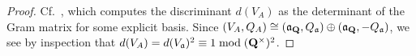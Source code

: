 \documentclass{amsart}
\theoremstyle{definition}
\theoremstyle{definition}
\theoremstyle{definition}
\begin{document}
\begin{proof} Cf.~\cite[Proposition 3.3 (ii)]{VO}, which computes the discriminant $d(V_A)$ as the determinant of the Gram matrix for some explicit basis.
Since $(V_A, Q_A) \cong (\mathfrak{a}_{\bf{Q}} , Q_{\mathfrak{a}}) \oplus (\mathfrak{a}_{\bf{Q}}, -Q_{\mathfrak{a}})$, 
we see by inspection that $d(V_A) = d(V_{\mathfrak{a}})^2 \equiv 1 \bmod ({\bf{Q}}^{\times})^2$.

\end{proof}
\end{document}
